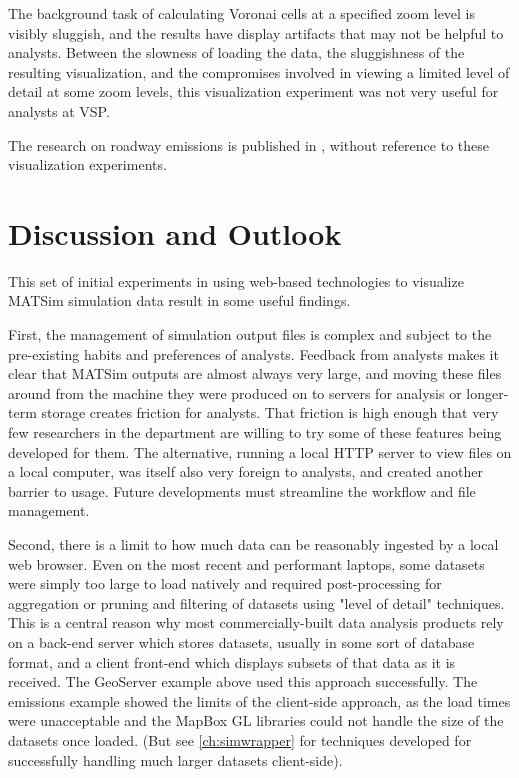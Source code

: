 The background task of calculating Voronai cells at a specified zoom level is visibly sluggish, and the results have display artifacts that may not be helpful to analysts. Between the slowness of loading the data, the sluggishness of the resulting visualization, and the compromises involved in viewing a limited level of detail at some zoom levels, this visualization experiment was not very useful for analysts at VSP.

The research on roadway emissions is published in \cite{kaddoura2022exhaust}, without reference to these visualization experiments.

\hypertarget{server-experiments-findings}{%
\section{Discussion and Outlook}\label{server-experiments-findings}}

This set of initial experiments in using web-based technologies to visualize MATSim simulation data result in some useful findings.

First, the management of simulation output files is complex and subject to the pre-existing habits and preferences of analysts. Feedback from analysts makes it clear that MATSim outputs are almost always very large, and moving these files around from the machine they were produced on to servers for analysis or longer-term storage creates friction for analysts. That friction is high enough that very few researchers in the department are willing to try some of these features being developed for them. The alternative, running a local HTTP server to view files on a local computer, was itself also very foreign to analysts, and created another barrier to usage. Future developments must streamline the workflow and file management.

Second, there is a limit to how much data can be reasonably ingested by a local web browser. Even on the most recent and performant laptops, some datasets were simply too large to load natively and required post-processing for aggregation or pruning and filtering of datasets using "level of detail" techniques. This is a central reason why most commercially-built data analysis products rely on a back-end server which stores datasets, usually in some sort of database format, and a client front-end which displays subsets of that data as it is received. The GeoServer example above used this approach successfully. The emissions example showed the limits of the client-side approach, as the load times were unacceptable and the MapBox GL libraries could not handle the size of the datasets once loaded. (But see \autoref{ch:simwrapper} for techniques developed for successfully handling much larger datasets client-side).

